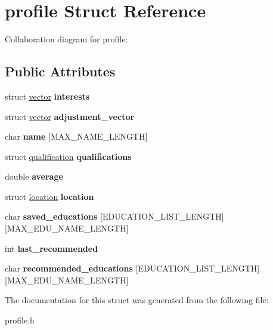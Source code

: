 \hypertarget{structprofile}{}\section{profile Struct Reference}
\label{structprofile}


Collaboration diagram for profile\+:
\subsection*{Public Attributes}
\begin{DoxyCompactItemize}
\item 
\mbox{\label{structprofile_a313de9760bb4abc3125aedcdc2d8e464}} 
struct \hyperlink{structvector}{vector} {\bfseries interests}
\item 
\mbox{\label{structprofile_a228b35200c8acd36c799e65fb9ee8c82}} 
struct \hyperlink{structvector}{vector} {\bfseries adjustment\+\_\+vector}
\item 
\mbox{\label{structprofile_aa5f452c2e28f63f9947b7c62d099ce9c}} 
char {\bfseries name} \mbox{[}M\+A\+X\+\_\+\+N\+A\+M\+E\+\_\+\+L\+E\+N\+G\+TH\mbox{]}
\item 
\mbox{\label{structprofile_ad4a90ac3791cc3a1fab5824fb9771ed5}} 
struct \hyperlink{structqualification}{qualification} {\bfseries qualifications}
\item 
\mbox{\label{structprofile_a1c5f94e6a8da32cfef600b126dc5fccb}} 
double {\bfseries average}
\item 
\mbox{\label{structprofile_ae86aa2c5432de3cb2705d2269b2e1b86}} 
struct \hyperlink{structlocation}{location} {\bfseries location}
\item 
\mbox{\label{structprofile_a3761452afdcb4ead85f3c8162c08a87f}} 
char {\bfseries saved\+\_\+educations} \mbox{[}E\+D\+U\+C\+A\+T\+I\+O\+N\+\_\+\+L\+I\+S\+T\+\_\+\+L\+E\+N\+G\+TH\mbox{]}\mbox{[}M\+A\+X\+\_\+\+E\+D\+U\+\_\+\+N\+A\+M\+E\+\_\+\+L\+E\+N\+G\+TH\mbox{]}
\item 
\mbox{\label{structprofile_a642839ebfcadc7b5f50429830f573c85}} 
int {\bfseries last\+\_\+recommended}
\item 
\mbox{\label{structprofile_a2ad59943b1463691981170ca9391fdf4}} 
char {\bfseries recommended\+\_\+educations} \mbox{[}E\+D\+U\+C\+A\+T\+I\+O\+N\+\_\+\+L\+I\+S\+T\+\_\+\+L\+E\+N\+G\+TH\mbox{]}\mbox{[}M\+A\+X\+\_\+\+E\+D\+U\+\_\+\+N\+A\+M\+E\+\_\+\+L\+E\+N\+G\+TH\mbox{]}
\end{DoxyCompactItemize}


The documentation for this struct was generated from the following file\+:\begin{DoxyCompactItemize}
\item 
profile.\+h\end{DoxyCompactItemize}
